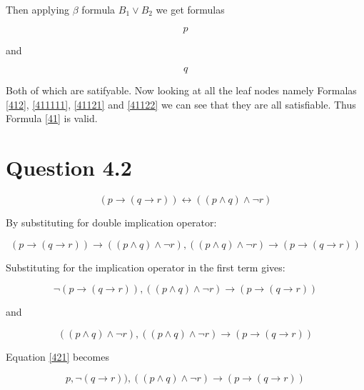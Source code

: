 \documentclass[10pt,a4paper]{article}
\begin{document}
Then applying $\beta$ formula $B_1 \vee B_2$ we get formulas

\begin{equation}
 \label{41121}
 p
\end{equation}

and 

\begin{equation}
\label{41122}
q
\end{equation}

Both of which are satifyable. Now looking at all the leaf nodes namely 
Formalas \ref{412}, \ref{411111}, \ref{41121} and \ref{41122} we can see that they are all satisfiable. Thus
Formula \ref{41} is valid.







\section{Question 4.2}

\begin{equation}
\label{420}
(p \rightarrow ( q \rightarrow r )) \leftrightarrow (( p \wedge q) \wedge \neg r) 
\end{equation}

By substituting for double implication operator:

\begin{equation}
 (p \rightarrow ( q \rightarrow r )) \rightarrow (( p \wedge q) \wedge \neg r), (( p \wedge q) \wedge \neg r) \rightarrow (p \rightarrow ( q \rightarrow r )) 
\end{equation}

Substituting for the implication operator in the first term gives:

\begin{equation}
\label{421}
 \neg(p \rightarrow ( q \rightarrow r )),  (( p \wedge q) \wedge \neg r) \rightarrow (p \rightarrow ( q \rightarrow r )) 
\end{equation}

and

\begin{equation}
\label{422}
 ((p \wedge q) \wedge \neg r ),  (( p \wedge q) \wedge \neg r) \rightarrow (p \rightarrow ( q \rightarrow r )) 
\end{equation}

Equation \ref{421} becomes

\begin{equation}
p, \neg ( q \rightarrow r )),  (( p \wedge q) \wedge \neg r) \rightarrow (p \rightarrow ( q \rightarrow r )) 
\end{equation}
\end{document}
